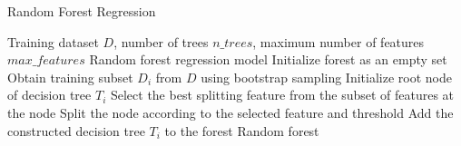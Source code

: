 \documentclass{article}
\begin{document}
	
	\begin{algorithm}
		\caption{Random Forest Regression}
		\begin{algorithmic}[1]
			\Require Training dataset $D$, number of trees $n\_trees$, maximum number of features $max\_features$
			\Ensure Random forest regression model
			\State Initialize forest as an empty set
			\State Obtain training subset $D_i$ from $D$ using bootstrap sampling
			\State Initialize root node of decision tree $T_i$
			\State Select the best splitting feature from the subset of features at the node
			\State Split the node according to the selected feature and threshold
			\EndWhile
			\State Add the constructed decision tree $T_i$ to the forest
			\EndFor
			\State \Return Random forest
		\end{algorithmic}
	\end{algorithm}
	
\end{document}

